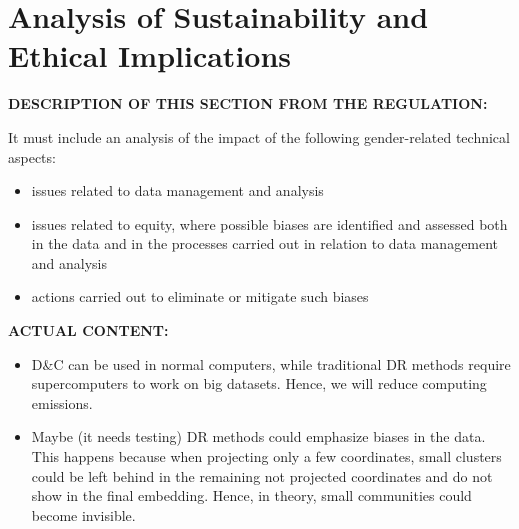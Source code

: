 \section{Analysis of Sustainability and Ethical Implications}

\textbf{DESCRIPTION OF THIS SECTION FROM THE REGULATION:}

It must include an analysis of the impact of the following gender-related technical aspects:
\begin{itemize}
    \item issues related to data management and analysis
    \item issues related to equity, where possible biases are identified and assessed both in the data and in the processes carried out in relation to data management and analysis
    \item actions carried out to eliminate or mitigate such biases
\end{itemize}

\textbf{ACTUAL CONTENT:}

\begin{itemize}
    \item D\&C can be used in normal computers, while traditional DR methods require supercomputers to work on big datasets. Hence, we will reduce computing emissions.
    \item Maybe (it needs testing) DR methods could emphasize biases in the data. This happens because when projecting only a few coordinates, small clusters could be left behind in the remaining not projected coordinates and do not show in the final embedding. Hence, in theory, small communities could become invisible.
\end{itemize}